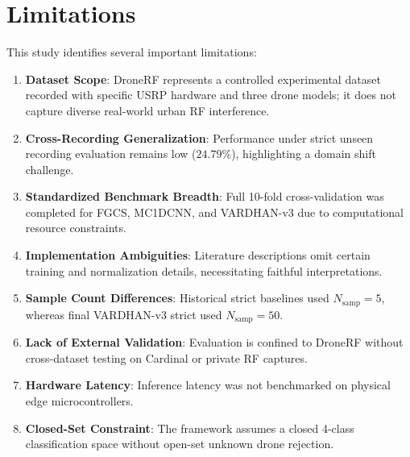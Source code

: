 \documentclass[journal,10pt,twocolumn]{IEEEtran}
\begin{document}
\section{Limitations}
This study identifies several important limitations:
\begin{enumerate}
    \item \textbf{Dataset Scope}: DroneRF represents a controlled experimental dataset recorded with specific USRP hardware and three drone models; it does not capture diverse real-world urban RF interference.
    \item \textbf{Cross-Recording Generalization}: Performance under strict unseen recording evaluation remains low ($24.79\%$), highlighting a domain shift challenge.
    \item \textbf{Standardized Benchmark Breadth}: Full 10-fold cross-validation was completed for FGCS, MC1DCNN, and VARDHAN-v3 due to computational resource constraints.
    \item \textbf{Implementation Ambiguities}: Literature descriptions omit certain training and normalization details, necessitating faithful interpretations.
    \item \textbf{Sample Count Differences}: Historical strict baselines used $N_{\text{samp}}=5$, whereas final VARDHAN-v3 strict used $N_{\text{samp}}=50$.
    \item \textbf{Lack of External Validation}: Evaluation is confined to DroneRF without cross-dataset testing on Cardinal or private RF captures.
    \item \textbf{Hardware Latency}: Inference latency was not benchmarked on physical edge microcontrollers.
    \item \textbf{Closed-Set Constraint}: The framework assumes a closed 4-class classification space without open-set unknown drone rejection.
\end{enumerate}
\end{document}
